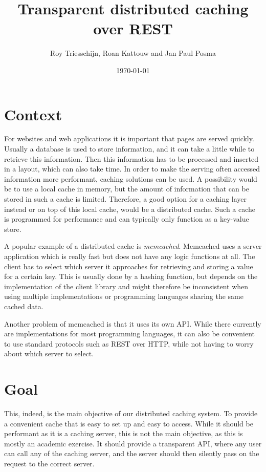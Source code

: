 \documentclass[11pt]{article}
\begin{document}
\author{Roy Triesschijn, Roan Kattouw and Jan Paul Posma}
\date{\today}
\title{Transparent distributed caching over REST}

\maketitle

\section*{Context}
For websites and web applications it is important that pages are served quickly. Usually a database is used to store information, and it can take a little while to retrieve this information. Then this information has to be processed and inserted in a layout, which can also take time. In order to make the serving often accessed information more performant, caching solutions can be used. A possibility would be to use a local cache in memory, but the amount of information that can be stored in such a cache is limited. Therefore, a good option for a caching layer instead or on top of this local cache, would be a distributed cache. Such a cache is programmed for performance and can typically only function as a key-value store.

A popular example of a distributed cache is \emph{memcached}. Memcached uses a server application which is really fast but does not have any logic functions at all. The client has to select which server it approaches for retrieving and storing a value for a certain key. This is usually done by a hashing function, but depends on the implementation of the client library and might therefore be inconsistent when using multiple implementations or programming languages sharing the same cached data.

Another problem of memcached is that it uses its own API. While there currently are implementations for most programming languages, it can also be convenient to use standard protocols such as REST over HTTP, while not having to worry about which server to select.

\section*{Goal}
This, indeed, is the main objective of our distributed caching system. To provide a convenient cache that is easy to set up and easy to access. While it should be performant as it is a caching server, this is not the main objective, as this is mostly an academic exercise. It should provide a transparent API, where any user can call any of the caching server, and the server should then silently pass on the request to the correct server.
\end{document}
